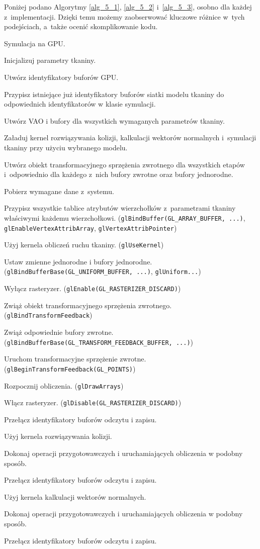 		Poniżej podano Algorytmy \ref{alg_5_1}, \ref{alg_5_2} i~\ref{alg_5_3}, osobno dla każdej z~implementacji. Dzięki temu możemy zaobserwować kluczowe różnice w~tych podejściach, a~także ocenić skomplikowanie kodu.
		\newpage
		\begin{algorithm}[H]
			\label{alg_5_1}
			\caption{Symulacja na GPU.}	
			
			Inicjalizuj parametry tkaniny.
			
			Utwórz identyfikatory buforów GPU.
			
			Przypisz istniejące już identyfikatory buforów siatki modelu tkaniny do odpowiednich identyfikatorów w klasie symulacji.
			
			Utwórz VAO i bufory dla wszystkich wymaganych parametrów tkaniny.
			
			Załaduj kernel rozwiązywania kolizji, kalkulacji wektorów normalnych i~symulacji tkaniny przy użyciu wybranego modelu.
			
			Utwórz obiekt transformacyjnego sprzężenia zwrotnego dla wszystkich etapów i~odpowiednio dla każdego z~nich bufory zwrotne oraz bufory jednorodne.

			{
				Pobierz wymagane dane z~systemu. 
				
				Przypisz wszystkie tablice atrybutów wierzchołków z~parametrami tkaniny właściwymi każdemu wierzchołkowi. (\texttt{glBindBuffer(GL\_ARRAY\_BUFFER, ...)}, \texttt{glEnableVertexAttribArray}, \texttt{glVertexAttribPointer})
				
				Użyj kernela obliczeń ruchu tkaniny. (\texttt{glUseKernel})
				
				Ustaw zmienne jednorodne i bufory jednorodne. (\texttt{glBindBufferBase(GL\_UNIFORM\_BUFFER, ...)}, \texttt{glUniform...})
				
				Wyłącz rasteryzer. (\texttt{glEnable(GL\_RASTERIZER\_DISCARD)})
				
				Zwiąż obiekt transformacyjnego sprzężenia zwrotnego. (\texttt{glBindTransformFeedback})
				
				Zwiąż odpowiednie bufory zwrotne. (\texttt{glBindBufferBase(GL\_TRANSFORM\_FEEDBACK\_BUFFER, ...)})
				
				Uruchom transformacyjne sprzężenie zwrotne. (\texttt{glBeginTransformFeedback(GL\_POINTS)})
				
				Rozpocznij obliczenia. (\texttt{glDrawArrays})
				
				Włącz rasteryzer. (\texttt{glDisable(GL\_RASTERIZER\_DISCARD)})
				
				Przełącz identyfikatory buforów odczytu i zapisu.
				
				Użyj kernela rozwiązywania kolizji.
				
				Dokonaj operacji przygotowawczych i uruchamiających obliczenia w podobny sposób.
				
				Przełącz identyfikatory buforów odczytu i zapisu.
				
				Użyj kernela kalkulacji wektorów normalnych.
				
				Dokonaj operacji przygotowawczych i uruchamiających obliczenia w podobny sposób.
				
				Przełącz identyfikatory buforów odczytu i zapisu.
			}
		\end{algorithm}
